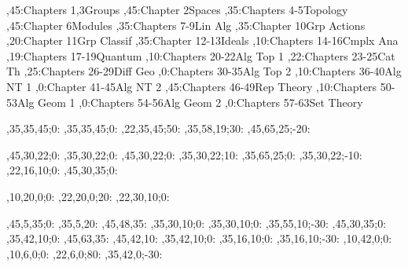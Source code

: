 
\bgroup
\renewcommand{\href}[1]{} %
\renewcommand{\solidwidth}{0.7pt}
\renewcommand{\boldwidth}{1.5pt}

\setcounter{diagheight}{50}
\begin{chart}
,45:{Chapters 1,3}{Groups}{}
,45:{Chapter 2}{Spaces}{}
,35:{Chapters 4-5}{Topology}{}
,45:{Chapter 6}{Modules}{}
,35:{Chapters 7-9}{Lin Alg}{}
,35:{Chapter 10}{Grp Actions}{}
,20:{Chapter 11}{Grp Classif}{}
,35:{Chapter 12-13}{Ideals}{}
,10:{Chapters 14-16}{Cmplx Ana}{}
,19:{Chapters 17-19}{Quantum}{}
,10:{Chapters 20-22}{Alg Top 1}{}
,22:{Chapters 23-25}{Cat Th}{}
,25:{Chapters 26-29}{Diff Geo}{}
,0:{Chapters 30-35}{Alg Top 2}{}
,10:{Chapters 36-40}{Alg NT 1}{}
,0:{Chapter 41-45}{Alg NT 2}{}
,45:{Chapters 46-49}{Rep Theory}{}
,10:{Chapters 50-53}{Alg Geom 1}{}
,0:{Chapters 54-56}{Alg Geom 2}{}
,0:{Chapters 57-63}{Set Theory}{}

,35,35,45;0:   %
,35,35,45;0:   %
,22,35,45;50: %
,35,58,19;30:  %
,45,65,25;-20: %

,45,30,22;0:   %
,35,30,22;0:   %
,45,30,22;0:   %
,35,30,22;10:  %
,35,65,25;0:   %
,35,30,22;-10: %
,22,16,10;0:   %
,45,30,35;0:   %

,10,20,0;0:    %
,22,20,0;20:   %
,22,30,10;0:   %

,45,5,35;0:    %
,35,5,20:      %
,45,48,35:     %
,35,30,10;0:   %
,35,30,10;0:   %
,35,55,10;-30: %
,45,30,35;0:   %
,35,42,10;0:   %
,45,63,35:     %
,45,42,10:     %
,35,42,10;0:   %
,35,16,10;0:   %
,35,16,10;-30: %
,10,42,0;0:    %
,10,6,0;0:     %
,22,6,0;80:     %
,35,42,0;-30:  %
\end{chart}
\egroup
